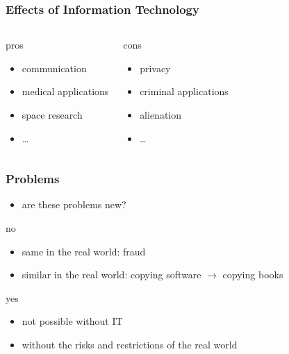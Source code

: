 \documentclass[dvipsnames]{beamer}
\theoremstyle{plain}
\begin{document}
\begin{frame}
  \frametitle{Effects of Information Technology}

  \begin{columns}
    \begin{block}{pros}
      \begin{itemize}
        \item communication
        \item medical applications
        \item space research
        \item \ldots
      \end{itemize}
    \end{block}

    \pause
    \begin{block}{cons}
      \begin{itemize}
        \item privacy
        \item criminal applications
        \item alienation
        \item \ldots
      \end{itemize}
    \end{block}
  \end{columns}
\end{frame}

\begin{frame}
  \frametitle{Problems}

  \begin{itemize}
    \item are these problems new?
  \end{itemize}

  \begin{block}{no}
    \begin{itemize}
      \item same in the real world: fraud
      \item similar in the real world:
        copying software $\rightarrow$ copying books
    \end{itemize}
  \end{block}

  \pause
  \begin{block}{yes}
    \begin{itemize}
      \item not possible without IT
      \item without the risks and restrictions of the real world
    \end{itemize}
  \end{block}
\end{frame}
\end{document}
